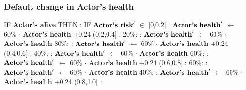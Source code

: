 \documentclass{article}%
\begin{document}
\subsubsection{Default change in Actor's health}%
\label{ssubsec:Default change in Actor's health}%
\begin{flushleft}%
IF %
\textbf{Actor's alive}%
\linebreak%
\hspace*{2em}%
THEN %
: %
IF %
$\mbox{\textbf{Actor's risk}} '$%
$\in$%
\linebreak%
\hspace*{4em}%
{[}0,0.2{]}%
: %
$\mbox{\textbf{Actor's health}} '$%
$\leftarrow$%
60\%%
$\cdot$%
\textbf{Actor's health}%
+0.24%
\linebreak%
\hspace*{4em}%
(0.2,0.4{]}%
: %
\linebreak%
\hspace*{6em}%
20\%:%
: %
$\mbox{\textbf{Actor's health}} '$%
$\leftarrow$%
60\%%
$\cdot$%
\textbf{Actor's health}%
\linebreak%
\hspace*{6em}%
80\%:%
: %
$\mbox{\textbf{Actor's health}} '$%
$\leftarrow$%
60\%%
$\cdot$%
\textbf{Actor's health}%
+0.24%
\linebreak%
\hspace*{4em}%
(0.4,0.6{]}%
: %
\linebreak%
\hspace*{6em}%
40\%:%
: %
$\mbox{\textbf{Actor's health}} '$%
$\leftarrow$%
60\%%
$\cdot$%
\textbf{Actor's health}%
\linebreak%
\hspace*{6em}%
60\%:%
: %
$\mbox{\textbf{Actor's health}} '$%
$\leftarrow$%
60\%%
$\cdot$%
\textbf{Actor's health}%
+0.24%
\linebreak%
\hspace*{4em}%
(0.6,0.8{]}%
: %
\linebreak%
\hspace*{6em}%
60\%:%
: %
$\mbox{\textbf{Actor's health}} '$%
$\leftarrow$%
60\%%
$\cdot$%
\textbf{Actor's health}%
\linebreak%
\hspace*{6em}%
40\%:%
: %
$\mbox{\textbf{Actor's health}} '$%
$\leftarrow$%
60\%%
$\cdot$%
\textbf{Actor's health}%
+0.24%
\linebreak%
\hspace*{4em}%
(0.8,1.0{]}%
: %
\linebreak%
\hspace*{6em}%

\end{flushleft}
\end{document}
